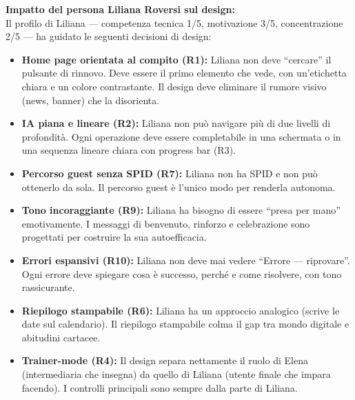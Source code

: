 \documentclass[11pt,a4paper]{article}
\begin{document}
\begin{tcolorbox}[colback=backgroundColor,colframe=borderColor,arc=2mm]
    {\small
    \textbf{Impatto del persona Liliana Roversi sul design:} \\[4pt]
    Il profilo di Liliana --- competenza tecnica 1/5, motivazione 3/5, concentrazione 2/5 --- ha guidato le seguenti decisioni di design:
    \begin{itemize}[leftmargin=*]
        \item \textbf{Home page orientata al compito (R1):} Liliana non deve ``cercare'' il pulsante di rinnovo. Deve essere il primo elemento che vede, con un'etichetta chiara e un colore contrastante. Il design deve eliminare il rumore visivo (news, banner) che la disorienta.
        \item \textbf{IA piana e lineare (R2):} Liliana non può navigare più di due livelli di profondità. Ogni operazione deve essere completabile in una schermata o in una sequenza lineare chiara con progress bar (R3).
        \item \textbf{Percorso guest senza SPID (R7):} Liliana non ha SPID e non può ottenerlo da sola. Il percorso guest è l'unico modo per renderla autonoma.
        \item \textbf{Tono incoraggiante (R9):} Liliana ha bisogno di essere ``presa per mano'' emotivamente. I messaggi di benvenuto, rinforzo e celebrazione sono progettati per costruire la sua autoefficacia.
        \item \textbf{Errori espansivi (R10):} Liliana non deve mai vedere ``Errore --- riprovare''. Ogni errore deve spiegare cosa è successo, perché e come risolvere, con tono rassicurante.
        \item \textbf{Riepilogo stampabile (R6):} Liliana ha un approccio analogico (scrive le date sul calendario). Il riepilogo stampabile colma il gap tra mondo digitale e abitudini cartacee.
        \item \textbf{Trainer-mode (R4):} Il design separa nettamente il ruolo di Elena (intermediaria che insegna) da quello di Liliana (utente finale che impara facendo). I controlli principali sono sempre dalla parte di Liliana.
    \end{itemize}
    }
\end{tcolorbox}

\vspace{0.3cm}
\end{document}
